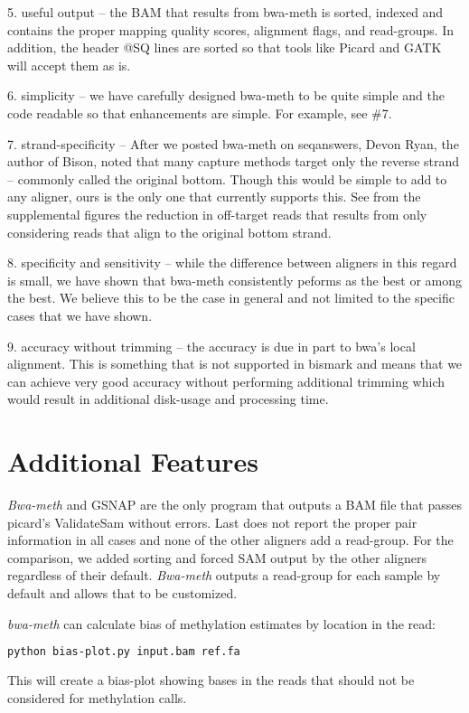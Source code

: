 \documentclass[12pt]{article}
\begin{document}
5. useful output -- the BAM that results from bwa-meth is sorted, indexed and
   contains the proper mapping quality scores, alignment flags, and read-groups.
   In addition, the header @SQ lines are sorted so that tools like Picard and
   GATK will accept them as is.

6. simplicity -- we have carefully designed bwa-meth to be quite simple and
   the code readable so that enhancements are simple. For example, see \#7.

7. strand-specificity -- After we posted bwa-meth on seqanswers, Devon Ryan,
   the author of Bison, noted that many capture methods target only the reverse
   strand -- commonly called the original bottom. Though this would be simple to
   add to any aligner, ours is the only one that currently supports this. See
   from the supplemental figures the reduction in off-target reads that results
   from only considering reads that align to the original bottom strand.

8. specificity and sensitivity -- while the difference between aligners in
   this regard is small, we have shown that bwa-meth consistently peforms as the
   best or among the best. We believe this to be the case in general and not
   limited to the specific cases that we have shown.

9. accuracy without trimming -- the accuracy is due in part to bwa's local
   alignment. This is something that is not supported in bismark and means that
   we can achieve very good accuracy without performing additional trimming
   which would result in additional disk-usage and processing time.

\section{Additional Features}
\textit{Bwa-meth} and GSNAP are the only program that outputs a BAM file that passes picard's ValidateSam without errors.
Last does not report the proper pair information in all cases and none of the other aligners add a read-group.
For the comparison, we added sorting and forced SAM output by the other aligners regardless of their default.
\textit{Bwa-meth} outputs a read-group for each sample by default and allows that to be customized.

\textit{bwa-meth} can calculate bias of methylation estimates by location in the read:

\begin{lstlisting}[language=bash]
python bias-plot.py input.bam ref.fa
\end{lstlisting}
This will create a bias-plot showing bases in the reads that should not be considered
for methylation calls.
\end{document}
